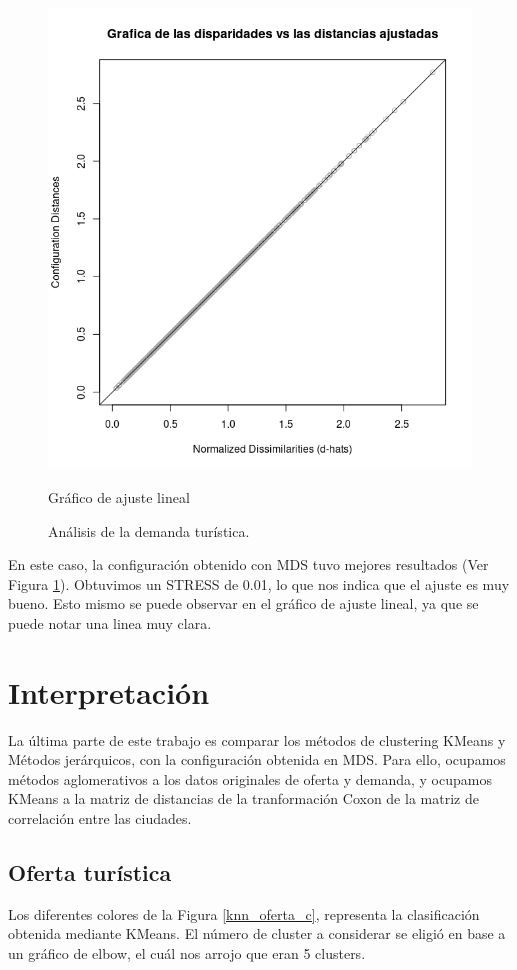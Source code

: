 \documentclass[11pt,letterpaper]{article}
\begin{document}
\begin{figure}[H]
  \includegraphics[width=\linewidth]{figure/line_demanda.png}\caption{Gráfico de ajuste lineal}\label{line_demanda}
\endminipage
\caption{Análisis de la demanda turística.}\label{ana_demanda}
\end{figure}
En este caso, la configuración obtenido con MDS tuvo mejores resultados (Ver Figura \ref{ana_demanda}). Obtuvimos un STRESS de 0.01, lo que nos indica que el ajuste es muy bueno. Esto mismo se puede observar en el gráfico de ajuste lineal, ya que se puede notar una linea muy clara.



\section{Interpretación}
La última parte de este trabajo es comparar los métodos de clustering KMeans y Métodos jerárquicos, con la configuración obtenida en MDS. Para ello, ocupamos métodos aglomerativos a los datos originales de oferta y demanda, y ocupamos KMeans a la matriz de distancias de la tranformación Coxon de la matriz de correlación entre las ciudades. 
\subsection{Oferta turística}
Los diferentes colores de la Figura \ref{knn_oferta_c}, representa la clasificación obtenida mediante KMeans. El número de cluster a considerar se eligió en base a un gráfico de elbow, el cuál nos arrojo que eran 5 clusters. \\
\end{document}
